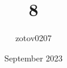 \documentclass{article}
\title{8}
\author{zotov0207}
\date{September 2023}
\begin{document}

\pagebreak


\end{document}
